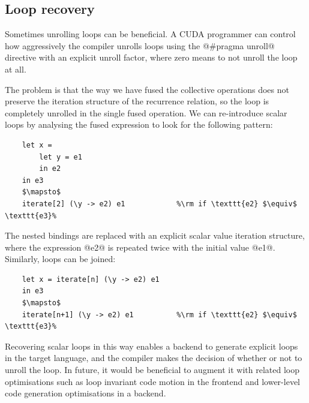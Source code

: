 

\subsection{Loop recovery}

Sometimes unrolling loops can be beneficial. A CUDA programmer can control how
aggressively the compiler unrolls loops using the @#pragma unroll@
directive with an explicit unroll factor, where zero means to not unroll the
loop at all.

The problem is that the way we have fused the collective operations does not
preserve the iteration structure of the recurrence relation, so the loop is
completely unrolled in the single fused operation. We can re-introduce scalar
loops by analysing the fused expression to look for the following pattern:
%
\begin{lstlisting}[style=Haskell,numbers=none,mathescape]
%\bf$\langle$ loop introduction $\rangle$%
    let x =
        let y = e1
        in e2
    in e3
    $\mapsto$
    iterate[2] (\y -> e2) e1            %\rm if \texttt{e2} $\equiv$ \texttt{e3}%
\end{lstlisting}
%
The nested bindings are replaced with an explicit scalar value iteration
structure, where the expression @e2@ is repeated twice with the initial
value @e1@. Similarly, loops can be joined:
%
\begin{lstlisting}[style=Haskell,numbers=none,mathescape]
%\bf$\langle$ loop joining $\rangle$%
    let x = iterate[n] (\y -> e2) e1
    in e3
    $\mapsto$
    iterate[n+1] (\y -> e2) e1          %\rm if \texttt{e2} $\equiv$ \texttt{e3}%
\end{lstlisting}
%
Recovering scalar loops in this way enables a backend to generate explicit loops
in the target language, and the compiler makes the decision of whether or not to
unroll the loop. In future, it would be beneficial to augment it with related
loop optimisations such as loop invariant code motion in the frontend and
lower-level code generation optimisations in a backend.


